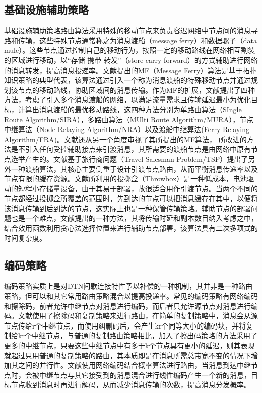 \subsection{基础设施辅助策略}
基础设施辅助策略路由算法采用特殊的移动节点来负责容迟网络中节点间的消息寻路和传输，这些特殊节点通常称之为消息渡船（message ferry）和数据骡子（data mule）。这些节点通过控制自己的移动行为，按照一定的移动路线在网络相互割裂的区域进行移动，以“存储-携带-转发”（store-carry-forward）的方式辅助进行网络的消息转发，提高消息投递率。文献提出的MF（Message Ferry）算法是基于拓扑知识策略的典型代表，该算法通过引入一个称为消息渡船的特殊移动节点并通过规划该节点的移动路线，协助区域间的消息传输。作为MF的扩展，文献提出了四种方法，考虑了引入多个消息渡船的网络，以满足流量需求且传输延迟最小为优化目标，计算出消息渡船的最优移动路线，这四种方法分别为单路由算法（SIngle Route Algorithm/SIRA），多路由算法（MUlti Route Algorithm/MURA），节点中继算法（Node Relaying Algorithm/NRA）以及渡船中继算法(Ferry Relaying Algorithm/FRA)。文献还从另一个角度审视了其所提出的MF算法， 所改进的方法是不引入任何受控辅助接点来引渡消息，其所需要的渡船节点是由网络中原有节点选举产生的。文献基于旅行商问题（Travel Salesman Problem/TSP）提出了另外一种渡船算法，其核心主要侧重于设计引渡节点路由，从而平衡消息传递率以及节点有限的缓存资源。文献所利用的投掷盒（Throwbox）是一种低成本，电池驱动的短程小存储量设备，由于其易于部署，故很适合用作引渡节点。当两个不同的节点都经过投掷盒所覆盖的范围时，先到达的节点可以把消息缓存在其中，以便将该消息传输到后到达的节点，这实际上也是一种保管传输策略。辅助节点的部署问题也是一个难点，文献提出的一种方法，其将传输时延和副本数目纳入考虑之中，结合效用函数利用贪心法选择位置来进行辅助节点部署，该算法具有二次多项式的时间复杂度。


\subsection{编码策略}
编码策略实质上是对DTN间歇连接特性予以补偿的一种机制，其并非是一种路由策略，但可以和其它常用路由策略混合以提高投递率。常见的编码策略有网络编码和擦除码，前者允许中继节点对消息进行编码，而后者只允许源节点对消息进行编码。文献使用了擦除码和复制策略来进行路由，在简单的复制策略中，消息会从源节点传给r个中继节点，而使用纠删码后，会产生kr个同等大小的编码块，并将复制给kr个中继节点，与普通的复制路由策略相比，加入了擦出码策略的方法采用了更多的中继节点，只要这些中继节点中有多于k个节点具有更小的延迟，则其表现就超过只用普通的复制策略的路由，其本质即是在消息所需总带宽不变的情况下增加其之间的并行性。文献使用网络编码结合概率算法进行路由，当消息到达中继节点时，会被中继节点与其它接受到的消息混合进行线性编码产生一个新的消息，目标节点收到消息时再进行解码，从而减少消息传输的次数，提高消息分发概率。


